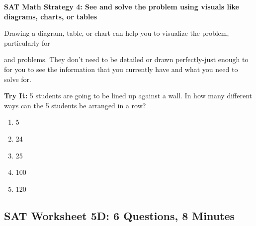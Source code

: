 \documentclass[12pt]{book}
\newcommand{\longline}{\underline{\hspace{2in}} }
\begin{document}
\newpage
\textbf{SAT Math Strategy 4: See and solve the problem using visuals like diagrams, charts, or tables}

\bigskip
Drawing a diagram, table, or chart can help you to visualize the problem, particularly for

\longline and \longline problems. They don't need to be detailed or drawn perfectly-just enough to for you to see the information that you currently have and what you need to solve for.

\bigskip
\textbf{Try It:} 5 students are going to be lined up against a wall. In how many different ways can the 5 students be arranged in a row?

\begin{enumerate}[label=(\Alph*)]
\item 5
\item 24
\item 25
\item 100
\item 120
\end{enumerate}

\newpage
\subsection{SAT Worksheet 5D: 6 Questions, 8 Minutes}
\end{document}
